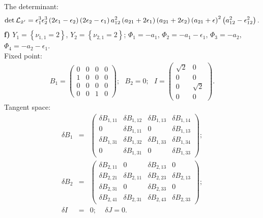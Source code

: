 \documentclass[a4paper,12pt]{article}
\begin{document}
The determinant:
\begin{eqnarray}
\det {\cal L}_{{\tilde x}'}=\epsilon_1^3 \epsilon_2^3
\left(2\epsilon_1 -\epsilon_2 \right) \left(2\epsilon_2
-\epsilon_1 \right)a_{12}^2 \left(a_{21}+2\epsilon_1 \right)
\left(a_{21}+2\epsilon_2 \right)\left(a_{21}+\epsilon
\right)^2\left(a_{12}^2-\epsilon_{12}^2 \right).
\end{eqnarray}
{\bf f)} $Y_1=\left\{\nu_{1,1}=2 \right\}$,
$Y_2=\left\{\nu_{2,1}=2 \right\}$; $\Phi_1=-a_1$,
$\Phi_2=-a_1-\epsilon_1$,
$\Phi_3=-a_2$, $\Phi_4=-a_2-\epsilon_1$. \\
Fixed point:
\begin{eqnarray}
B_1=\left(\begin{array}{cccc} 0 & 0 & 0 & 0 \\ 1 & 0 & 0 & 0 \\ 0 & 0 & 0 & 0 \\
0 & 0 & 1 & 0
\end{array}\right); \, \, \, \,
B_2=0; \, \, \, \, I=\left(\begin{array}{cc} \sqrt{2} & 0 \\ 0 & 0 \\ 0 & \sqrt{2} \\0 & 0
\end{array}\right).
\end{eqnarray}
Tangent space:
\begin{eqnarray}
\delta B_1 &=& \left(\begin{array}{cccc} \delta B_{1,11} & \delta B_{1,12} & \delta B_{1,13} & \delta B_{1,14} \\
0 & \delta B_{1,11} & 0 & \delta B_{1,13} \\
\delta B_{1,31} & \delta B_{1,32} & \delta B_{1,33} & \delta B_{1,34}
\\ 0 & \delta B_{1,31} & 0 & \delta B_{1,33}
\end{array}\right); \nonumber \\
\delta B_2 &=& \left(\begin{array}{cccc} \delta B_{2,11} & 0 & \delta B_{2,13} & 0 \\ \delta B_{2,21} & \delta B_{2,11} & \delta B_{2,23} & \delta B_{2,13} \\
\delta B_{2,31} & 0 & \delta B_{2,33} & 0 \\
\delta B_{2,41} & \delta B_{2,31} & \delta B_{2,43} & \delta B_{2,33}
\end{array}\right); \nonumber \\
\delta I &=& 0; \, \, \, \, \, \, \, \delta J= 0.
\end{eqnarray}
\end{document}
